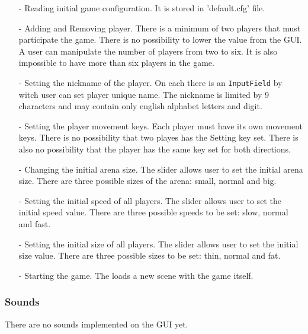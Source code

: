 \begin{itemize}
	\item[-] Reading initial game configuration. It is stored in 'default.cfg' file.
	\item[-] Adding and Removing player. There is a minimum of two players that must participate the game. There is no possibility  to lower the value from the GUI. A user can manipulate the number of players from two to six. It is also impossible to have more than six players in the game.
	\item[-] Setting the nickname of the player. On each  there is an \verb+InputField+ by witch user can set player unique name. The nickname is limited by 9 characters and may contain only english alphabet letters and digit.
	\item[-] Setting the player movement keys. Each player must have its own movement keys. There is no possibility that two playes has the Setting key set. There is also no possibility that the player has the same key set for both directions.
	\item[-] Changing the initial arena size. The  slider allows user to set the initial arena size. There are three possible sizes of the arena: small, normal and big.
	\item[-] Setting the initial speed of all players. The  slider allows user to set the initial speed value. There are three possible speeds to be set: slow, normal and fast.
	\item[-] Setting the initial size of all players. The  slider allows user to set the initial size value. There are three possible sizes to be set: thin, normal and fat.
	\item[-] Starting the game. The  loads a new scene with the game itself.
\end{itemize} 

\subsubsection{Sounds}
\indent There are no sounds implemented on the GUI yet.